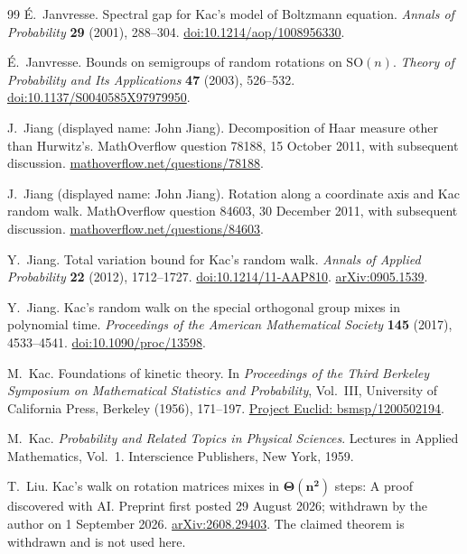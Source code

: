 \documentclass[11pt]{article}
\theoremstyle{definition}\newtheorem{definition}[theorem]{Definition}
\theoremstyle{remark}\newtheorem{remark}[theorem]{Remark}
\begin{document}
\begin{thebibliography}{99}
 \'E.~Janvresse.
Spectral gap for Kac's model of Boltzmann equation.
\emph{Annals of Probability} \textbf{29} (2001), 288--304.
\href{https://doi.org/10.1214/aop/1008956330}{doi:10.1214/aop/1008956330}.

 \'E.~Janvresse.
Bounds on semigroups of random rotations on $\mathrm{SO}(n)$.
\emph{Theory of Probability and Its Applications} \textbf{47} (2003), 526--532.
\href{https://doi.org/10.1137/S0040585X97979950}{doi:10.1137/S0040585X97979950}.

 J.~Jiang (displayed name: John Jiang).
Decomposition of Haar measure other than Hurwitz's.
MathOverflow question 78188, 15 October 2011, with subsequent discussion.
\href{https://mathoverflow.net/questions/78188/decomposition-of-haar-measure-other-than-hurwitzs}{mathoverflow.net/questions/78188}.

 J.~Jiang (displayed name: John Jiang).
Rotation along a coordinate axis and Kac random walk.
MathOverflow question 84603, 30 December 2011, with subsequent discussion.
\href{https://mathoverflow.net/questions/84603/rotation-along-a-coordinate-axis-and-kac-random-walk}{mathoverflow.net/questions/84603}.

 Y.~Jiang.
Total variation bound for Kac's random walk.
\emph{Annals of Applied Probability} \textbf{22} (2012), 1712--1727.
\href{https://doi.org/10.1214/11-AAP810}{doi:10.1214/11-AAP810}.
\href{https://arxiv.org/abs/0905.1539}{arXiv:0905.1539}.

 Y.~Jiang.
Kac's random walk on the special orthogonal group mixes in polynomial time.
\emph{Proceedings of the American Mathematical Society} \textbf{145} (2017), 4533--4541.
\href{https://doi.org/10.1090/proc/13598}{doi:10.1090/proc/13598}.

 M.~Kac.
Foundations of kinetic theory.
In \emph{Proceedings of the Third Berkeley Symposium on Mathematical Statistics and Probability}, Vol.~III,
University of California Press, Berkeley (1956), 171--197.
\href{https://projecteuclid.org/euclid.bsmsp/1200502194}{Project Euclid: bsmsp/1200502194}.

 M.~Kac.
\emph{Probability and Related Topics in Physical Sciences}.
Lectures in Applied Mathematics, Vol.~1. Interscience Publishers, New York, 1959.

 T.~Liu.
Kac's walk on rotation matrices mixes in $\boldsymbol{\Theta(n^2)}$ steps: A proof discovered with AI.
Preprint first posted 29 August 2026; withdrawn by the author on 1 September 2026.
\href{https://arxiv.org/abs/2608.29403}{arXiv:2608.29403}.
The claimed theorem is withdrawn and is not used here.


\end{thebibliography}
\end{document}
